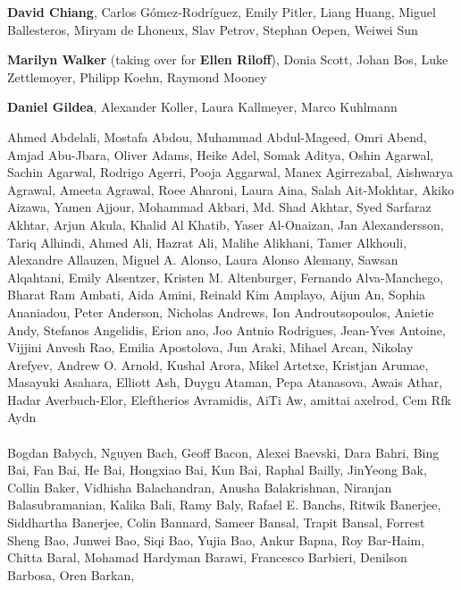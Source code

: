 \documentclass[11pt]{article}
\newcommand{\aclitem}[1][]{\item[#1:\vspace{2mm}]}
\begin{document}
\begin{description}[itemsep=4mm, style=nextline]
\begin{description}[itemsep=4mm, style=nextline]
\aclitem[Syntax: Tagging, Chunking and Parsing]
\textbf{David Chiang},
Carlos G\'{o}mez-Rodr\'{i}guez, Emily Pitler, Liang Huang, Miguel Ballesteros, Miryam de Lhoneux, Slav Petrov, Stephan Oepen, Weiwei Sun

\aclitem[Theme]
\textbf{Marilyn Walker} (taking over for \textbf{Ellen Riloff}),
Donia Scott, Johan Bos, Luke Zettlemoyer, Philipp Koehn, Raymond Mooney

\aclitem[Theory and Formalism in NLP (Linguistic and Mathematical)]
\textbf{Daniel Gildea},
Alexander Koller, Laura Kallmeyer, Marco Kuhlmann
\end{description}


\aclitem[Primary Reviewers]
Ahmed Abdelali, 
Mostafa Abdou, 
Muhammad Abdul-Mageed, 
Omri Abend, 
Amjad Abu-Jbara, 
Oliver Adams, 
Heike Adel, 
Somak Aditya, 
Oshin Agarwal, 
Sachin Agarwal, 
Rodrigo Agerri, 
Pooja Aggarwal, 
Manex Agirrezabal, 
Aishwarya Agrawal, 
Ameeta Agrawal, 
Roee Aharoni, 
Laura Aina, 
Salah Ait-Mokhtar, 
Akiko Aizawa, 
Yamen Ajjour, 
Mohammad Akbari, 
Md. Shad Akhtar, 
Syed Sarfaraz Akhtar, 
Arjun Akula, 
Khalid Al Khatib, 
Yaser Al-Onaizan, 
Jan Alexandersson, 
Tariq Alhindi, 
Ahmed Ali, 
Hazrat Ali, 
Malihe Alikhani, 
Tamer Alkhouli, 
Alexandre Allauzen, 
Miguel A. Alonso, 
Laura Alonso Alemany, 
Sawsan Alqahtani, 
Emily Alsentzer, 
Kristen M. Altenburger, 
Fernando Alva-Manchego, 
Bharat Ram Ambati, 
Aida Amini, 
Reinald Kim Amplayo, 
Aijun An, 
Sophia Ananiadou, 
Peter Anderson, 
Nicholas Andrews, 
Ion Androutsopoulos, 
Anietie Andy, 
Stefanos Angelidis, 
Erion ano, 
Joo Antnio Rodrigues, 
Jean-Yves Antoine, 
Vijjini Anvesh Rao, 
Emilia Apostolova, 
Jun Araki, 
Mihael Arcan, 
Nikolay Arefyev, 
Andrew O. Arnold, 
Kushal Arora, 
Mikel Artetxe, 
Kristjan Arumae, 
Masayuki Asahara, 
Elliott Ash, 
Duygu Ataman, 
Pepa Atanasova, 
Awais Athar, 
Hadar Averbuch-Elor, 
Eleftherios Avramidis, 
AiTi Aw, 
amittai axelrod, 
Cem Rfk Aydn 
\\
\\
Bogdan Babych, 
Nguyen Bach, 
Geoff Bacon, 
Alexei Baevski, 
Dara Bahri, 
Bing Bai, 
Fan Bai, 
He Bai, 
Hongxiao Bai, 
Kun Bai, 
Raphal Bailly, 
JinYeong Bak, 
Collin Baker, 
Vidhisha Balachandran, 
Anusha Balakrishnan, 
Niranjan Balasubramanian, 
Kalika Bali, 
Ramy Baly, 
Rafael E. Banchs, 
Ritwik Banerjee, 
Siddhartha Banerjee, 
Colin Bannard, 
Sameer Bansal, 
Trapit Bansal, 
Forrest Sheng Bao, 
Junwei Bao, 
Siqi Bao, 
Yujia Bao, 
Ankur Bapna, 
Roy Bar-Haim, 
Chitta Baral, 
Mohamad Hardyman Barawi, 
Francesco Barbieri, 
Denilson Barbosa, 
Oren Barkan, 

\end{description}
\end{document}
